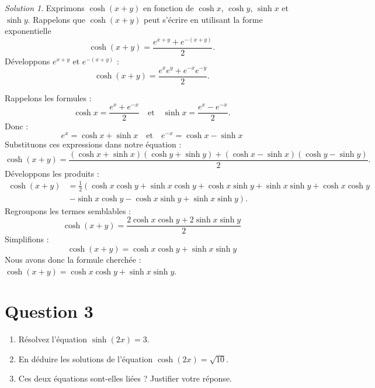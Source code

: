 \documentclass[
  12pt,
  letterpaper,
]{book}
\theoremstyle{remark}
\newtheorem*{solution}{Solution}
\begin{document}
\begin{solution}

Exprimons \(\cosh(x+y)\) en fonction de \(\cosh x\), \(\cosh y\),
\(\sinh x\) et \(\sinh y\). Rappelons que \(\cosh(x+y)\) peut s'écrire
en utilisant la forme exponentielle
\[\cosh(x+y) = \frac{e^{x+y} + e^{-(x+y)}}{2}.\] Développons \(e^{x+y}\)
et \(e^{-(x+y)}\) : \[\cosh(x+y) = \frac{e^x e^y + e^{-x} e^{-y}}{2}.\]

Rappelons les formules :
\[\cosh x = \frac{e^x + e^{-x}}{2} \quad \text{et} \quad \sinh x = \frac{e^x - e^{-x}}{2}.\]
Donc :
\[e^x = \cosh x + \sinh x \quad \text{et} \quad e^{-x} = \cosh x - \sinh x\]
Substituons ces expressions dans notre équation :
\[\cosh(x+y) = \frac{(\cosh x + \sinh x)(\cosh y + \sinh y) + (\cosh x - \sinh x)(\cosh y - \sinh y)}{2}.\]
Développons les produits : \begin{align}
\cosh(x+y) &= \frac{1}{2}\left(\cosh x \cosh y + \sinh x \cosh y + \cosh x \sinh y + \sinh x \sinh y + \cosh x \cosh y\right.\\
&~\left.- \sinh x \cosh y - \cosh x \sinh y + \sinh x \sinh y\right).
\end{align} Regroupons les termes semblables :
\[\cosh(x+y) = \frac{2\cosh x \cosh y + 2\sinh x \sinh y}{2}\]
Simplifions : \[\cosh(x+y) = \cosh x \cosh y + \sinh x \sinh y\] Nous
avons donc la formule cherchée :
\(\cosh(x+y) = \cosh x \cosh y + \sinh x \sinh y\).

\end{solution}

\hypertarget{question-3-3}{%
\section{Question 3}\label{question-3-3}}

\begin{enumerate}
\def\labelenumi{\arabic{enumi}.}
\item
  Résolvez l'équation \(\sinh(2x) = 3\).
\item
  En déduire les solutions de l'équation \(\cosh(2x) = \sqrt{10}\).
\item
  Ces deux équations sont-elles liées ? Justifier votre réponse.
\end{enumerate}
\end{document}
